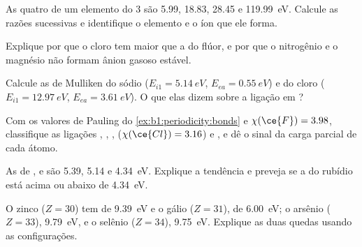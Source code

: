 \begin{exercise}[$\star\star$]\label{exo:b1:periodicity:5}
As quatro  de um elemento do  3 são
5.99, 18.83, 28.45 e \qty{119.99}{eV}. Calcule as razões sucessivas e
identifique o elemento e o íon que ele forma.
\end{exercise}

\begin{exercise}[$\star\star$]\label{exo:b1:periodicity:6}
Explique por que o cloro tem  maior que a do flúor,
e por que o nitrogênio e o magnésio não formam ânion gasoso estável.
\end{exercise}

\begin{exercise}[$\star\star$]\label{exo:b1:periodicity:7}
Calcule as  de Mulliken do sódio ($E_{i1} =
\qty{5.14}{eV}$, $E_{ea} = \qty{0.55}{eV}$) e do cloro ($E_{i1} =
\qty{12.97}{eV}$, $E_{ea} = \qty{3.61}{eV}$). O que elas dizem sobre a
ligação em ?
\end{exercise}

\begin{exercise}[$\star\star$]\label{exo:b1:periodicity:8}
Com os valores de Pauling do \cref{ex:b1:periodicity:bonds} e $\chi(\ce{F})
= 3.98$, classifique as ligações , , , 
($\chi(\ce{Cl}) = 3.16$) e , e dê o sinal da carga parcial
de cada átomo.
\end{exercise}

\begin{exercise}[$\star\star$]\label{exo:b1:periodicity:9}
As  de ,  e  são 5.39,
5.14 e \qty{4.34}{eV}. Explique a tendência e preveja se a do
rubídio está acima ou abaixo de \qty{4.34}{eV}.
\end{exercise}

\begin{exercise}[$\star\star\star$]\label{exo:b1:periodicity:10}
O zinco ($Z = 30$) tem  de \qty{9.39}{eV} e
o gálio ($Z = 31$), de \qty{6.00}{eV}; o arsênio ($Z = 33$), \qty{9.79}{eV},
e o selênio ($Z = 34$), \qty{9.75}{eV}. Explique as duas quedas usando as
configurações.
\end{exercise}


